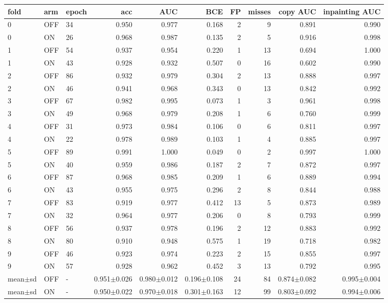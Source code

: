 \begin{tabular}{lllrrrrrrr}
\toprule
fold & arm & epoch & acc & AUC & BCE & FP & misses & copy AUC & inpainting AUC \\
\midrule
0 & OFF & 34 & 0.950 & 0.977 & 0.168 & 2 & 9 & 0.891 & 0.990 \\
0 & ON & 26 & 0.968 & 0.987 & 0.135 & 2 & 5 & 0.916 & 0.998 \\
1 & OFF & 54 & 0.937 & 0.954 & 0.220 & 1 & 13 & 0.694 & 1.000 \\
1 & ON & 43 & 0.928 & 0.932 & 0.507 & 0 & 16 & 0.602 & 0.990 \\
2 & OFF & 86 & 0.932 & 0.979 & 0.304 & 2 & 13 & 0.888 & 0.997 \\
2 & ON & 46 & 0.941 & 0.968 & 0.343 & 0 & 13 & 0.842 & 0.992 \\
3 & OFF & 67 & 0.982 & 0.995 & 0.073 & 1 & 3 & 0.961 & 0.998 \\
3 & ON & 49 & 0.968 & 0.979 & 0.208 & 1 & 6 & 0.760 & 0.999 \\
4 & OFF & 31 & 0.973 & 0.984 & 0.106 & 0 & 6 & 0.811 & 0.997 \\
4 & ON & 22 & 0.978 & 0.989 & 0.103 & 1 & 4 & 0.885 & 0.997 \\
5 & OFF & 89 & 0.991 & 1.000 & 0.049 & 0 & 2 & 0.997 & 1.000 \\
5 & ON & 40 & 0.959 & 0.986 & 0.187 & 2 & 7 & 0.872 & 0.997 \\
6 & OFF & 87 & 0.968 & 0.985 & 0.209 & 1 & 6 & 0.889 & 0.994 \\
6 & ON & 43 & 0.955 & 0.975 & 0.296 & 2 & 8 & 0.844 & 0.988 \\
7 & OFF & 83 & 0.919 & 0.977 & 0.412 & 13 & 5 & 0.873 & 0.989 \\
7 & ON & 32 & 0.964 & 0.977 & 0.206 & 0 & 8 & 0.793 & 0.999 \\
8 & OFF & 56 & 0.937 & 0.978 & 0.196 & 2 & 12 & 0.883 & 0.992 \\
8 & ON & 80 & 0.910 & 0.948 & 0.575 & 1 & 19 & 0.718 & 0.982 \\
9 & OFF & 46 & 0.923 & 0.974 & 0.223 & 2 & 15 & 0.855 & 0.997 \\
9 & ON & 57 & 0.928 & 0.962 & 0.452 & 3 & 13 & 0.792 & 0.995 \\
mean$\pm$sd & OFF & - & 0.951$\pm$0.026 & 0.980$\pm$0.012 & 0.196$\pm$0.108 & 24 & 84 & 0.874$\pm$0.082 & 0.995$\pm$0.004 \\
mean$\pm$sd & ON & - & 0.950$\pm$0.022 & 0.970$\pm$0.018 & 0.301$\pm$0.163 & 12 & 99 & 0.803$\pm$0.092 & 0.994$\pm$0.006 \\
\bottomrule
\end{tabular}

